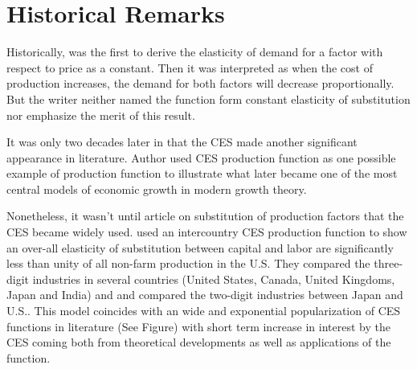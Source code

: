 \section{Historical Remarks}
Historically, \cite{Allen1938} was the first to derive the elasticity of demand for a factor with respect to price as a constant. Then it was interpreted as when the cost of production increases, the demand for both factors will decrease proportionally. But the writer neither named the function form constant elasticity of substitution nor emphasize the merit of this result.

It was only two decades later in \cite{Solow1956} that the CES made another significant appearance in literature. Author used CES production function as one possible example of production function to illustrate what later became one of the most central models of economic growth in modern growth theory.

Nonetheless, it wasn't until \cite{ACMS1961} article on substitution of production factors that the CES became widely used. \cite{ACMS1961} used an intercountry CES production function to show an over-all elasticity of substitution between capital and labor are significantly less than unity of all non-farm production in the U.S. They compared the three-digit industries in several countries (United States, Canada, United Kingdoms, Japan and India) and and compared the two-digit industries between Japan and U.S.. This model coincides with an wide and exponential popularization of CES functions in literature (See Figure) with short term increase in interest by the CES coming both from theoretical developments as well as applications of the function.


